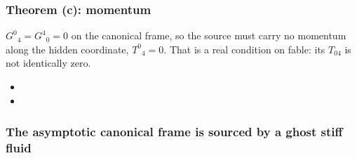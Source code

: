 \subsubsection{Theorem (c): momentum}
\label{sec:4.2.7}

$G^0{}_4=G^4{}_0=0$ on the canonical frame, so the source must carry no momentum along the hidden
coordinate, $T^0{}_4=0$. That is a real condition on fable: its $T_{04}$ is not identically zero.
\begin{itemize}
  \item {}
  \item {}
\end{itemize}

\subsubsection{The asymptotic canonical frame is sourced by a ghost stiff fluid}
\label{sec:4.2.8}

